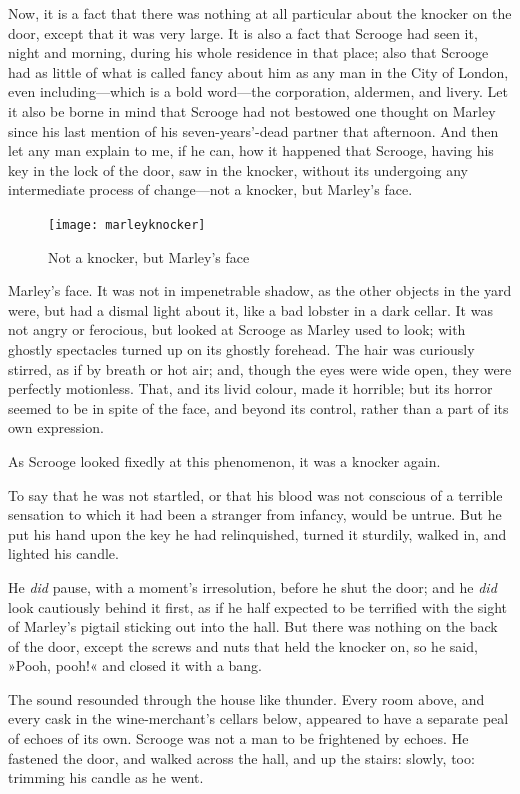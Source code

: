 Now, it is a fact that there was nothing at all particular about the knocker on the door, except that it was very large. It is also a fact that Scrooge had seen it, night and morning, during his whole residence in that place; also that Scrooge had as little of what is called fancy about him as any man in the City of London, even including—which is a bold word—the corporation, aldermen, and livery. Let it also be borne in mind that Scrooge had not bestowed one thought on Marley since his last mention of his seven-years'-dead partner that afternoon. And then let any man explain to me, if he can, how it happened that Scrooge, having his key in the lock of the door, saw in the knocker, without its undergoing any intermediate process of change—not a knocker, but Marley's face.

\begin{figure}[h]
\centering
\texttt{[image: marleyknocker]}
\caption{Not a knocker, but Marley's face}
\end{figure}

Marley's face. It was not in impenetrable shadow, as the other objects in the yard were, but had a dismal light about it, like a bad lobster in a dark cellar. It was not angry or ferocious, but looked at Scrooge as Marley used to look; with ghostly spectacles turned up on its ghostly forehead. The hair was curiously stirred, as if by breath or hot air; and, though the eyes were wide open, they were perfectly motionless. That, and its livid colour, made it horrible; but its horror seemed to be in spite of the face, and beyond its control, rather than a part of its own expression.

As Scrooge looked fixedly at this phenomenon, it was a knocker again.

To say that he was not startled, or that his blood was not conscious of a terrible sensation to which it had been a stranger from infancy, would be untrue. But he put his hand upon the key he had relinquished, turned it sturdily, walked in, and lighted his can\-dle.

He \textit{did} pause, with a moment's irresolution, before he shut the door; and he \textit{did} look cautiously behind it first, as if he half expected to be terrified with the sight of Marley's pigtail sticking out into the hall. But there was nothing on the back of the door, except the screws and nuts that held the knocker on, so he said, »Pooh, pooh!« and closed it with a bang.

The sound resounded through the house like thunder. Every room above, and every cask in the wine-merchant's cellars below, appeared to have a separate peal of echoes of its own. Scrooge was not a man to be frightened by echoes. He fastened the door, and walked across the hall, and up the stairs: slowly, too: trimming his candle as he went.

